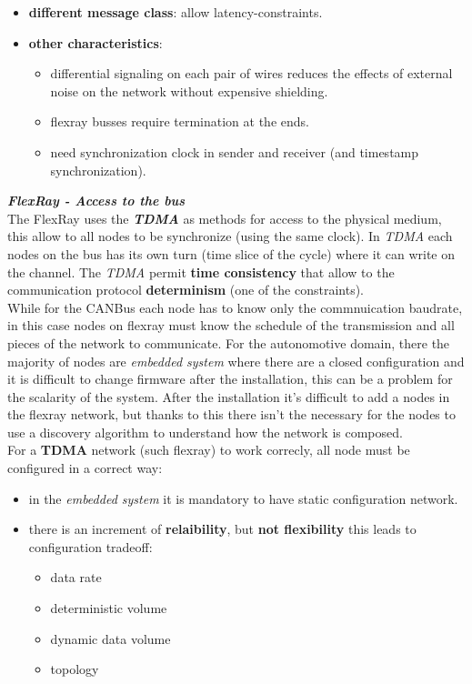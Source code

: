 \begin{itemize}[nosep]
    \item \textbf{different message class}: allow latency-constraints.

    \item \textbf{other characteristics}:
    \begin{itemize}[nosep]
        \item differential signaling on each pair of wires reduces the effects of
        external noise on the network without expensive shielding.
        \item flexray busses require termination at the ends.
        \item need synchronization clock in sender and receiver (and timestamp synchronization).
    \end{itemize}

\end{itemize}
\textbf{\textit{FlexRay - Access to the bus}} \\
The FlexRay uses the \textbf{\textit{TDMA}} as methods for access to the physical medium, this allow to all nodes to be synchronize (using the same clock). In \textit{TDMA} each nodes on the bus has its own turn (time slice of the cycle) where it can write on the channel. The \textit{TDMA} permit \textbf{time consistency} that allow to the communication protocol \textbf{determinism} (one of the constraints). \\
While for the CANBus each node has to know only the commnuication baudrate, in this case nodes on flexray must know the schedule of the transmission and all pieces of the network to communicate. For the autonomotive domain, there the majority of nodes are \textit{embedded system} where there are a closed configuration and it is difficult to change firmware after the installation, this can be a problem for the scalarity of the system. After the installation it's difficult to add a nodes in the flexray network, but thanks to this there isn't the necessary for the nodes to use a discovery algorithm to understand how the network is composed. \\
For a \textbf{TDMA} network (such flexray) to work correcly, all node must be configured in a correct way:
\begin{itemize}[nosep]
    \item in the \textit{embedded system} it is mandatory to have static configuration network.
    \item there is an increment of \textbf{relaibility}, but \textbf{not flexibility} this leads to configuration tradeoff:
    \begin{itemize}[nosep]
        \item data rate
        \item deterministic volume
        \item dynamic data volume
        \item topology
    \end{itemize}
\end{itemize}

